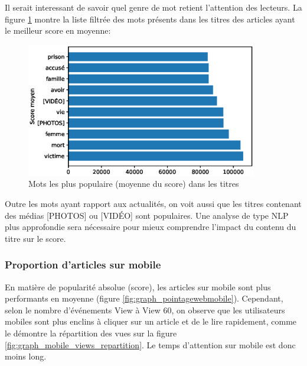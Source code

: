 \documentclass[french]{article}
\begin{document}
Il serait interessant de savoir quel genre de mot retient l'attention des lecteurs. La figure \ref{fig:graph_bar_word_popular} montre la liste filtrée des mots présents dans les titres des articles ayant le meilleur score en moyenne:

\begin{figure}[H]
    \centering
    \includegraphics[width=0.9\textwidth]{graph_bar_word_popular.eps}
    \caption{Mots les plus populaire (moyenne du score) dans les titres}
    \label{fig:graph_bar_word_popular}
\end{figure}

Outre les mots ayant rapport aux actualités, on voit aussi que les titres contenant des médias [PHOTOS] ou [VIDÉO] sont populaires. Une analyse de type NLP plus approfondie sera nécessaire pour mieux comprendre l'impact du contenu du titre sur le score.

\subsubsection{Proportion d'articles sur mobile}

En matière de popularité absolue (score), les articles sur mobile sont plus performants en moyenne (figure \ref{fig:graph_pointagewebmobile}). Cependant, selon le nombre d'événements View à View 60, on observe que les utilisateurs mobiles sont plus enclins à cliquer sur un article et de le lire rapidement, comme le démontre la répartition des vues sur la figure \ref{fig:graph_mobile_views_repartition}. Le temps d'attention sur mobile est donc moins long. 
\end{document}
